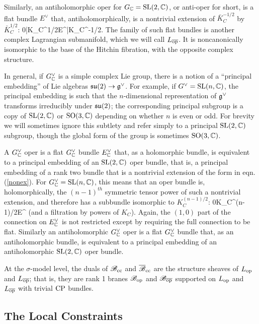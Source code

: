 \documentclass[11pt,a4paper]{article}
\begin{document}
 Similarly, an antiholomorphic oper for $G_{\mathbb C}={\mathrm{SL}}(2,{\mathbb C})$, or anti-oper for short, is a flat bundle $E^\vee$ that, antiholomorphically, is a nontrivial extension of 
$\bar K_C^{-1/2}$ by $\bar K_C^{1/2}$:
\be\label{onex} 0\to\bar K_C^{1/2}\to E^\vee \to \bar K_C^{-1/2}. \ee
The family of such flat bundles is another complex Lagrangian submanifold, which we will call $L_{\overline{\mathrm{op}}}$.   It is noncanonically isomorphic to the base
of the Hitchin fibration, with the opposite complex structure.


In general, if $G_{\mathbb C}^\vee$ is a simple complex Lie group, there is a notion of a ``principal embedding'' of Lie algebras ${{\mathfrak {su}}}(2)\to {{\mathfrak g}^\vee}$.  For example, if $G^\vee={\mathrm{SL}}(n,{\mathbb C})$,
the principal embedding is such that the $n$-dimensional representation of ${\mathfrak g}^\vee$ transforms irreducibly under ${\mathfrak {su}}(2)$; the corresponding principal
subgroup is a copy of ${\mathrm{SL}}(2,{\mathbb C})$ or ${\mathrm{SO}}(3,{\mathbb C})$ depending on whether $n$ is even or odd.   For brevity we will sometimes ignore this subtlety and
 refer simply to a principal
${\mathrm{SL}}(2,{\mathbb C})$ subgroup, though the global form of the group is sometimes ${\mathrm{SO}}(3,{\mathbb C})$.

A  $G_{\mathbb C}^\vee$
oper is a flat $G_{\mathbb C}^\vee$ bundle $E_{\mathbb C}^\vee$ that, as a holomorphic bundle, is equivalent to a principal embedding of an ${\mathrm{SL}}(2,{\mathbb C})$ oper bundle,
that is, a principal embedding of a rank two bundle that is  a nontrivial extension
of the form in eqn. (\ref{nonex}). For $G^\vee_{\mathbb C}={\mathrm{SL}}(n,{\mathbb C})$, this means that an oper bundle is, holomorphically, 
the $(n-1)^{th}$ symmetric tensor power of such a nontrivial extension, and therefore
has a subbundle isomorphic to $K_C^{(n-1)/2}$:
\be\label{nex}0\to K_C^{(n-1)/2}\to E^\vee\to \cdots \ee
(and a filtration by powers of $K_C$).
  Again,
the $(1,0)$ part of the connection on $E_{\mathbb C}^\vee$ is not restricted except by requiring the full connection to be flat.   Similarly an antiholomorphic $G_{\mathbb C}^\vee$ oper
is a flat $G_{\mathbb C}^\vee$ bundle that, as an antiholomorphic bundle, is equivalent to a principal embedding of an antiholomorphic ${\mathrm{SL}}(2,{\mathbb C})$ oper bundle.   

At the $\sigma$-model level, the  duals of ${\mathscr B}_{\mathrm{cc}}$ and ${\overline {\mathscr B}}_{\mathrm{cc}}$ are the structure sheaves of $L_{\mathrm{op}}$ and $L_{\overline{\mathrm{op}}}$; that is, they are 
rank 1 branes ${\mathscr B}_{\mathrm{op}}$ and ${\mathscr B}_{\overline{\mathrm{op}}}$   supported on $L_{\mathrm{op}}$ and $L_{\overline{\mathrm{op}}}$ with trivial ${\mathrm{CP}}$ bundles.

\subsection{The Local Constraints}\label{localoper}
\end{document}
